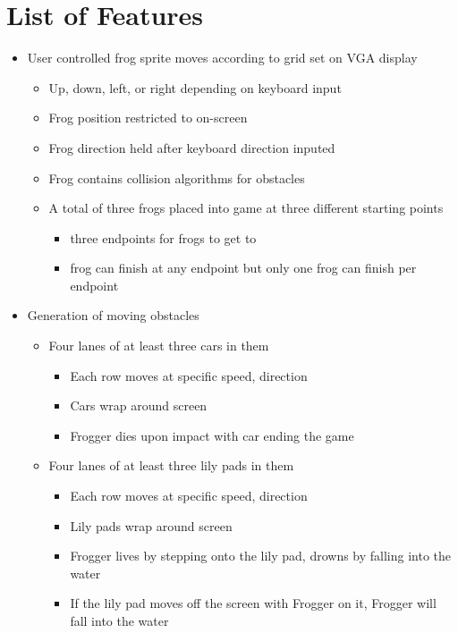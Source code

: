 \documentclass[journal, twocolumn, final,11pt,letterpaper]{IEEEtran}
\begin{document}
\section{List of Features}
\begin{itemize}
	\item User controlled frog sprite moves according to grid set on VGA display
	\begin{itemize}
		\item Up, down, left, or right depending on keyboard input
		\item Frog position restricted to on-screen
		\item Frog direction held after keyboard direction inputed
		\item Frog contains collision algorithms for obstacles 
		\item A total of three frogs placed into game at three different starting points
		\begin{itemize}
			\item three endpoints for frogs to get to
			\item frog can finish at any endpoint but only one frog can finish per endpoint 
		\end{itemize} 
	\end{itemize}
	\item Generation of moving obstacles
	\begin{itemize}
		\item Four lanes of at least three cars in them 
		\begin{itemize}
				\item Each row moves at specific speed, direction
				\item Cars wrap around screen
				\item Frogger dies upon impact with car ending the game
		\end{itemize}
		\item Four lanes of at least three lily pads in them
		\begin{itemize}
			\item Each row moves at specific speed, direction
			\item Lily pads wrap around screen
			\item Frogger lives by stepping onto the lily pad, drowns by falling into the water
			\item If the lily pad moves off the screen with Frogger on it, Frogger will fall into the water
		\end{itemize}
	\end{itemize}


\end{itemize}
\end{document}
